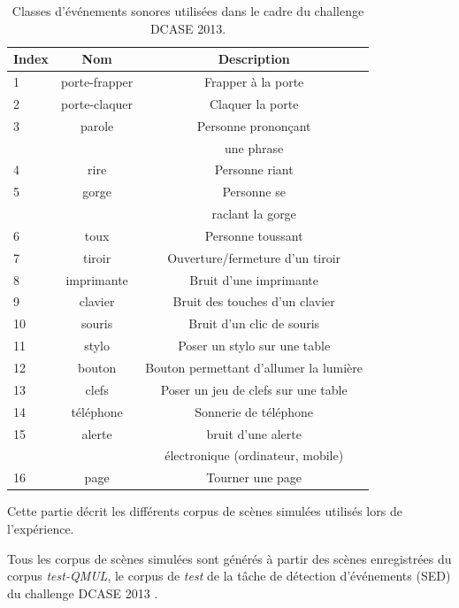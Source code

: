\begin{table}[t]
\begin{center}
\begin{tabular}{lcc}
\textbf{Index} & \textbf{Nom}  & \textbf{Description}  \\ 
\hline
1   & porte-frapper & Frapper à la porte \\
2   & porte-claquer & Claquer la porte \\
3   & parole        & Personne prononçant \\
    &               &  une phrase \\
4   & rire          & Personne riant  \\    
5   & gorge         & Personne se   \\
    &               & raclant la gorge \\
6   & toux          & Personne toussant \\
7   & tiroir        & Ouverture/fermeture d'un tiroir \\
8   & imprimante    & Bruit d'une imprimante \\
9   & clavier       & Bruit des touches d'un clavier \\
10  & souris        & Bruit d'un clic de souris \\
11  & stylo         & Poser un stylo sur une table \\
12  & bouton        & Bouton permettant d'allumer la lumière \\
13  & clefs         & Poser un jeu de clefs sur une table \\    
14  & téléphone     & Sonnerie de téléphone \\
15  & alerte        & bruit d'une alerte \\
    &               & électronique (ordinateur, mobile) \\
16  & page          & Tourner une page \\     
\hline      
\end{tabular}
\end{center}
\caption{Classes d'événements sonores utilisées dans le cadre du challenge DCASE 2013.}
\label{tab:eventDCASE2013}
\end{table}

Cette partie décrit les différents corpus de scènes simulées utilisés lors de l'expérience. 

Tous les corpus de scènes simulées sont générés à partir des scènes enregistrées du corpus \emph{test-QMUL}, le corpus de \emph{test} de la tâche de détection d'événements (SED) du challenge DCASE 2013  \citep{giannoulis2013detection}. 

